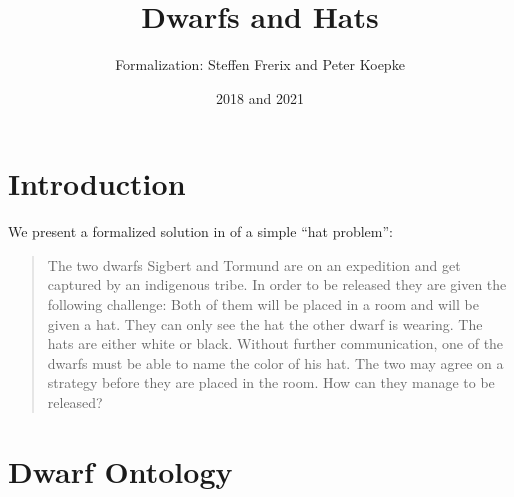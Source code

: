 \documentclass{article}
\title{Dwarfs and Hats}
\author{\Naproche{} Formalization: Steffen Frerix and Peter Koepke}
\date{2018 and 2021}
\begin{document}

  \maketitle
\section{Introduction}
We present a formalized solution in \Naproche of a simple ``hat problem'':  
\begin{quotation}
The two dwarfs Sigbert and Tormund are on an expedition and get captured
by an indigenous tribe. In order to be released they are given the following
challenge: Both of them will be placed in a room and will be given a hat. They
can only see the hat the other dwarf is wearing. The hats are either white or black.
Without further communication, one of the dwarfs must be able to name the color of
his hat.
The two may agree on a strategy before they are placed in the room. How can they manage
to be released?
\end{quotation}
\section{Dwarf Ontology}
\end{document}
